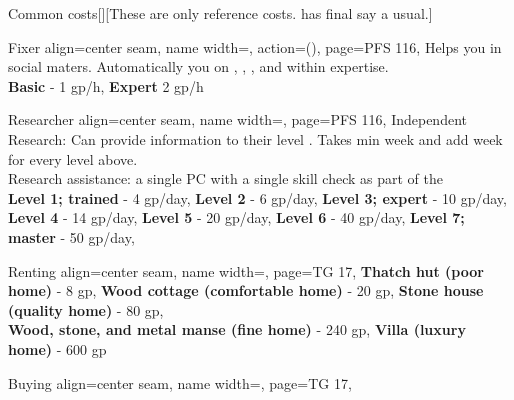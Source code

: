\begin{PageBack}
\begin{Tables}{\backTableHeight}
\begin{Table}{Common costs}[][These are only reference costs. \GM has final say a usual.]
\begin{entry}{Fixer }{%
                align=center seam,
                name width=\turnLength,%
                action={\BodyFont ()},
                page=PFS 116,
            }
                Helps you in social maters.\hfill
                Automatically  you on , , , and  within expertise.\\
                \textbf{Basic} - 1 gp/h, \quad
                \textbf{Expert}  2 gp/h 
            \end{entry}
            \begin{entry}{Researcher}{%
                align=center seam,
                name width=\turnLength,%
                page=PFS 116,
            }
                Independent Research: Can provide information to their level .\hfill
                Takes min  week and add  week for every level above.\\
                Research assistance:  a single PC with a single skill check as part of the \hfill
                \\
                \textbf{Level 1; trained} - 4 gp/day,\quad
                \textbf{Level 2} - 6 gp/day,\quad
                \textbf{Level 3; expert} - 10 gp/day, \hfill{}\\
                \textbf{Level 4} - 14 gp/day,\hspace{-0.73ex}\hphantom{; trained}\quad
                \textbf{Level 5} - 20 gp/day,\hspace{-0.73ex}\quad
                \textbf{Level 6} - 40 gp/day,\quad
                \textbf{Level 7; master} - 50 gp/day, \quad
            \end{entry}
            \breakLine[Housing]
            \begin{entry}{Renting}{%
                align=center seam,
                name width=\turnLength,%
                page=TG 17,
            }
                \textbf{Thatch hut (poor home)} - 8 gp, \hfill
                \textbf{Wood cottage (comfortable home)} - 20 gp, \hfill
                \textbf{Stone house (quality home)} - 80 gp,\\
                \textbf{Wood, stone, and metal manse (fine home)} - 240 gp, \quad
                \textbf{Villa (luxury home) } - 600 gp \hfill{}
            \end{entry}
            \begin{entry}{Buying}{%
                align=center seam,
                name width=\turnLength,%
                page=TG 17,
            }

\end{entry}
\end{Table}
\end{Tables}
\end{PageBack}

